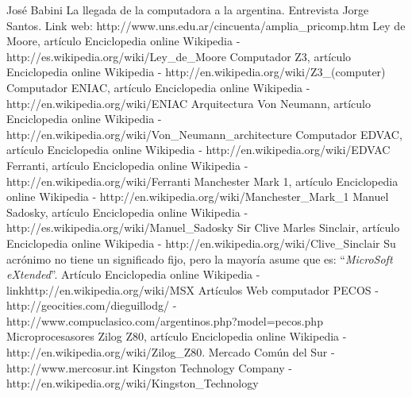 \documentclass[%
 	final,
%
	notitlepage,
	narroweqnarray,
	inline,
 	twoside,
	]{ieee}
\newcommand{\link}[1]{\textit{}{#1}}
\begin{document}
\begin{thebibliography}{1}

 Jos\'e Babini La llegada de la computadora a la argentina.
 Entrevista Jorge Santos.
 Link web: \link{http://www.uns.edu.ar/cincuenta/amplia\_pricomp.htm}
 Ley de Moore, art\'iculo Enciclopedia online Wikipedia -\link{http://es.wikipedia.org/wiki/Ley\_de\_Moore}
 Computador Z3, art\'iculo Enciclopedia online Wikipedia - \link{http://en.wikipedia.org/wiki/Z3\_(computer)}
 Computador ENIAC, art\'iculo Enciclopedia online Wikipedia - \link{http://en.wikipedia.org/wiki/ENIAC}
 Arquitectura Von Neumann, art\'iculo Enciclopedia online Wikipedia - \link{http://en.wikipedia.org/wiki/Von\_Neumann\_architecture}
 Computador EDVAC, art\'iculo Enciclopedia online Wikipedia - \link{http://en.wikipedia.org/wiki/EDVAC}
 Ferranti, art\'iculo Enciclopedia online Wikipedia - \link{http://en.wikipedia.org/wiki/Ferranti}
 Manchester Mark 1, art\'iculo Enciclopedia online Wikipedia - \link{http://en.wikipedia.org/wiki/Manchester\_Mark\_1}
 Manuel Sadosky, art\'iculo Enciclopedia online Wikipedia - \link{http://es.wikipedia.org/wiki/Manuel\_Sadosky}
 Sir Clive Marles Sinclair, art\'iculo Enciclopedia online Wikipedia - \link{http://en.wikipedia.org/wiki/Clive\_Sinclair}
 Su acr\'onimo no tiene un significado fijo, pero la mayor\'ia asume que es: ``\textit{MicroSoft eXtended}''. Art\'iculo Enciclopedia online Wikipedia - link{http://en.wikipedia.org/wiki/MSX}
 Art\'iculos Web computador PECOS - \link{http://geocities.com/dieguillodg/} - \link{http://www.compuclasico.com/argentinos.php?model=pecos.php}
 Microprocesasores Zilog Z80, art\'iculo Enciclopedia online Wikipedia - \link{http://en.wikipedia.org/wiki/Zilog\_Z80}.
 Mercado Com\'un del Sur - \link{http://www.mercosur.int}
 Kingston Technology Company - \link{http://en.wikipedia.org/wiki/Kingston\_Technology}





\end{thebibliography}
\end{document}
